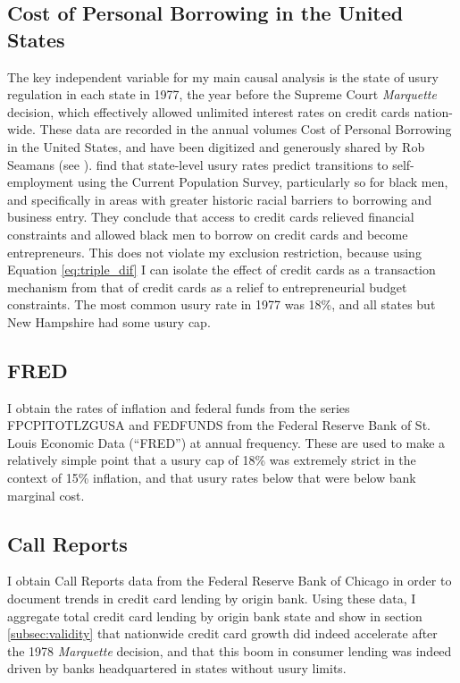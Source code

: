 \documentclass[12pt,english]{article}
\begin{document}
\subsection{Cost of Personal Borrowing in the United States}

The key independent variable for my main causal analysis is the state of usury regulation in each state in 1977, the year before the Supreme Court \emph{Marquette} decision, which effectively allowed unlimited interest rates on credit cards nation-wide. These data are recorded in the annual volumes Cost of Personal Borrowing in the United States, and have been digitized and generously shared by Rob Seamans (see \cite{chatterji_entrepreneurial_2012}). \cite{chatterji_entrepreneurial_2012} find that state-level usury rates predict transitions to self-employment using the Current Population Survey, particularly so for black men, and specifically in areas with greater historic racial barriers to borrowing and business entry. They conclude that access to credit cards relieved financial constraints and allowed black men to borrow on credit cards and become entrepreneurs. This does not violate my exclusion restriction, because using Equation \ref{eq:triple_dif} I can isolate the effect of credit cards as a transaction mechanism from that of credit cards as a relief to entrepreneurial budget constraints. The most common usury rate in 1977 was 18\%, and all states but New Hampshire had some usury cap. 

\subsection{FRED}

I obtain the rates of inflation and federal funds from the series FPCPITOTLZGUSA and FEDFUNDS from the Federal Reserve Bank of St. Louis Economic Data (``FRED'') at annual frequency. These are used to make a relatively simple point that a usury cap of 18\% was extremely strict in the context of 15\% inflation, and that usury rates below that were below bank marginal cost. 

\subsection{Call Reports}

I obtain Call Reports data from the Federal Reserve Bank of Chicago in order to document trends in credit card lending by origin bank. Using these data, I aggregate total credit card lending by origin bank state and show in section \ref{subsec:validity} that nationwide credit card growth did indeed accelerate after the 1978 \emph{Marquette} decision, and that this boom in consumer lending was indeed driven by banks headquartered in states without usury limits. 
\end{document}
